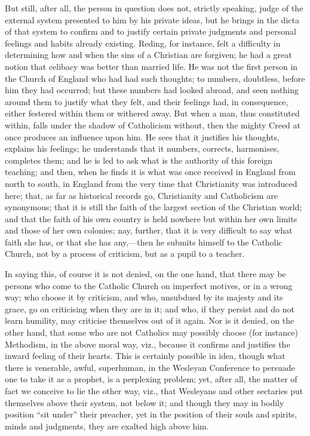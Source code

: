 But still, after all, the person in question does not, strictly
speaking, judge of the external system presented to him by his private
ideas, but he brings in the dicta of that system to confirm and to
justify certain private judgments and personal feelings and habits
already existing. Reding, for instance, felt a difficulty in
determining how and when the sins of a Christian are forgiven; he had
a great notion that celibacy was better than married life. He was not
the first person in the Church of England who had had such thoughts;
to numbers, doubtless, before him they had occurred; but these numbers
had looked abroad, and seen nothing around them to justify what they
felt, and their feelings had, in consequence, either festered within
them or withered away. But when a man, thus constituted within, falls
under the shadow of Catholicism without, then the mighty Creed at once
produces an influence upon him. He sees that it justifies his
thoughts, explains his feelings; he understands that it numbers,
corrects, harmonises, completes them; and he is led to ask what is the
authority of this foreign teaching; and then, when he finds it is what
was once received in England from north to south, in England from the
very time that Christianity was introduced here; that, as far as
historical records go, Christianity and Catholicism are synonymous;
that it is still the faith of the largest section of the Christian
world; and that the faith of his own country is held nowhere but
within her own limits and those of her own colonies; nay, further,
that it is very difficult to say what faith she has, or that she has
any,—then he submits himself to the Catholic Church, not by a
process of criticism, but as a pupil to a teacher.

In saying this, of course it is not denied, on the one hand, that
there may be persons who come to the Catholic Church on imperfect
motives, or in a wrong way; who choose it by criticism, and who,
unsubdued by its majesty and its grace, go on criticising when they
are in it; and who, if they persist and do not learn humility, may
criticise themselves out of it again. Nor is it denied, on the other
hand, that some who are not Catholics may possibly choose (for
instance) Methodism, in the above moral way, viz., because it confirms
and justifies the inward feeling of their hearts. This is certainly
possible in idea, though what there is venerable, awful, superhuman,
in the Wesleyan Conference to persuade one to take it as a prophet, is
a perplexing problem; yet, after all, the matter of fact we conceive
to lie the other way, viz., that Wesleyans and other sectaries
put themselves above their system, not below it; and though they may
in bodily position ``sit under'' their preacher, yet in the
position of their souls and spirits, minds and judgments, they are
exalted high above him.


